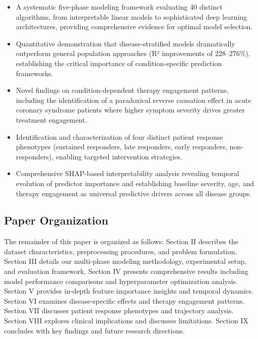 \documentclass[conference]{IEEEtran}
\begin{document}
\begin{itemize}
    \item A systematic five-phase modeling framework evaluating 40 distinct algorithms, from interpretable linear models to sophisticated deep learning architectures, providing comprehensive evidence for optimal model selection.
    
    \item Quantitative demonstration that disease-stratified models dramatically outperform general population approaches (R² improvements of 228–276\%), establishing the critical importance of condition-specific prediction frameworks.
    
    \item Novel findings on condition-dependent therapy engagement patterns, including the identification of a paradoxical reverse causation effect in acute coronary syndrome patients where higher symptom severity drives greater treatment engagement.
    
    \item Identification and characterization of four distinct patient response phenotypes (sustained responders, late responders, early responders, non-responders), enabling targeted intervention strategies.
    
    \item Comprehensive SHAP-based interpretability analysis revealing temporal evolution of predictor importance and establishing baseline severity, age, and therapy engagement as universal predictive drivers across all disease groups.
\end{itemize}

\subsection{Paper Organization}

The remainder of this paper is organized as follows: Section II describes the dataset characteristics, preprocessing procedures, and problem formulation. Section III details our multi-phase modeling methodology, experimental setup, and evaluation framework. Section IV presents comprehensive results including model performance comparisons and hyperparameter optimization analysis. Section V provides in-depth feature importance insights and temporal dynamics. Section VI examines disease-specific effects and therapy engagement patterns. Section VII discusses patient response phenotypes and trajectory analysis. Section VIII explores clinical implications and discusses limitations. Section IX concludes with key findings and future research directions.
\end{document}
